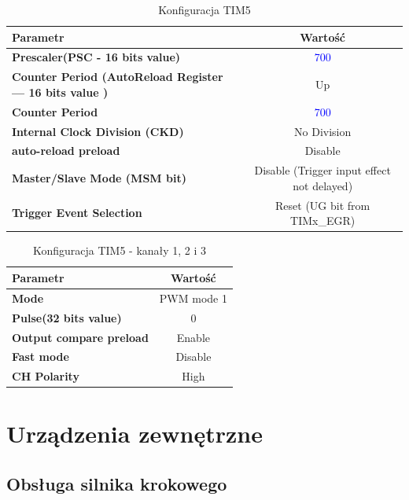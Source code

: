 \documentclass[10pt, a4paper]{article}
\begin{document}
\begin{table}[H]
    \centering
    \begin{tabular}{|l|c|} \hline
        \textbf{Parametr} & Wartość \\
        \hline
        \hline  \textbf{Prescaler(PSC - 16 bits value) }& \textcolor{blue}{700} \\
        \hline  \textbf{Counter Period (AutoReload Register --- 16 bits value )} & Up \\
        \hline  \textbf{Counter Period} & \textcolor{blue}{700} \\
        \hline  \textbf{Internal Clock Division (CKD) } & No Division\\
        \hline  \textbf{auto-reload preload} & Disable\\
        \hline  \textbf{Master/Slave Mode (MSM bit) } & Disable (Trigger input effect not delayed)
        \\
    \hline  \textbf{Trigger Event Selection} & Reset (UG bit from TIMx\_EGR)  \\
    \hline
 
    \end{tabular}
    \caption{Konfiguracja TIM5}
    \label{tab:TIM5}
\end{table}
 
\begin{table}[H]
    \centering
    \begin{tabular}{|l|c|} \hline
    \textbf{Parametr} & Wartość \\
    \hline
    \hline  \textbf{Mode} & PWM mode 1 \\
    \hline  \textbf{Pulse(32 bits value)} & 0 \\
    \hline  \textbf{Output compare preload} & Enable \\
    \hline  \textbf{Fast mode} & Disable \\
    \hline  \textbf{CH Polarity} & High \\
    \hline
    \end{tabular}
    \caption{Konfiguracja TIM5 - kanały 1, 2 i 3}
    \label{tab:CHANNELS}
\end{table}

\section{Urządzenia zewnętrzne}


\subsection{Obsługa silnika krokowego}
\end{document}
